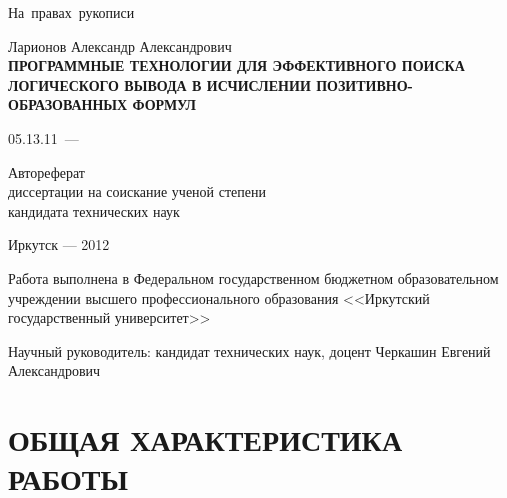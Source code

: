 \documentclass[a4paper]{report}
\begin{document}
\begin{titlepage}
\hfill{\vbox{\hbox{На правах рукописи}}}
\vspace{1cm}
\begin{center}
    Ларионов Александр Александрович \\
    \vspace{0.5cm}
\bf ПРОГРАММНЫЕ ТЕХНОЛОГИИ ДЛЯ ЭФФЕКТИВНОГО ПОИСКА ЛОГИЧЕСКОГО ВЫВОДА В ИСЧИСЛЕНИИ ПОЗИТИВНО-ОБРАЗОВАННЫХ ФОРМУЛ
\end{center}
\vfill
\hfil\hbox{\hbox{05.13.11 --- }
    \hbox{}%
}\hfil
\vspace{1cm}
\begin{center}
    Автореферат \\
    диссертации на соискание ученой степени \\
    кандидата технических наук
\end{center}
\vfill
\vfill
\begin{center}
{Иркутск --- 2012}
\end{center}
\end{titlepage}

%
\def\namepc{\hbox{$\rm\mu{}$PrISM}}

\newpage

Работа выполнена в Федеральном государственном бюджетном образовательном учреждении высшего профессионального образования <<Иркутский государственный университет>>

Научный руководитель: кандидат технических наук, доцент Черкашин Евгений Александрович


\newpage

\section*{ОБЩАЯ ХАРАКТЕРИСТИКА РАБОТЫ}
\end{document}
